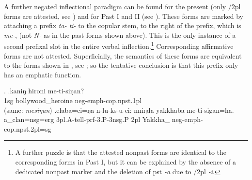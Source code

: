  
A further negated inflectional paradigm can be found for the present  (only {/2pl} forms are attested, see \Next) and for Past I and II (see ). These forms are marked by attaching a prefix \emph{ta- \ti ti-} to the copular stem, to the right of the  prefix, which is  \emph{me-}, (not \emph{N-} as in the past forms shown above). This is the only instance of a second prefixal slot in the entire verbal inflection.\footnote{A further puzzle is that the attested nonpast forms are identical to the corresponding forms in Past I, but it can be explained by the absence of a dedicated nonpast marker and the deletion of {\sc pst} \emph{-a} due to {/2pl} \emph{-i}.}  Corresponding affirmative forms are not attested. Superficially, the semantics of these forms are equivalent to the forms shown in , see \Next[a]; so the tentative conclusion is that this prefix only has an emphatic function.

\ex. \ag.kaniŋ hironi me-ti-siŋan?\\
{\sc 1sg} bollywood\_heroine {\sc neg-emph-cop.npst.1pl}\\
 (same: \emph{mesiŋan})
\bg.elaba=ci=ŋa n-lu-ks-u-ci:     nniŋda yakkhaba    me-ti-sigan=ha.\\
a\_clan{\sc =nsg=erg} {\sc 3pl.A-}tell{\sc -prf-3.P-3nsg.P}  {\sc 2pl} Yakkha\_ {\sc neg-emph-cop.npst.2pl=sg}\\
 

